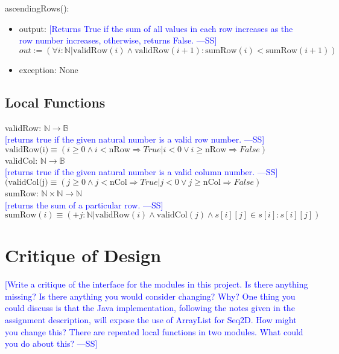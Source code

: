 \documentclass[12pt]{article}
\newcommand{\authornote}[3]{\textcolor{#1}{[#3 ---#2]}}
\newcommand{\authornote}[3]{}
\newcommand{\wss}[1]{\authornote{blue}{SS}{#1}}
\begin{document}
\noindent ascendingRows():
\begin{itemize}
\item output: \wss{Returns True if the sum of all values in each row increases
    as the row number increases, otherwise, returns False.}\\
$out := (\forall i: \mathbb{N} | \text{validRow}(i) \wedge \text{validRow}(i+1): \text{sumRow}(i) < \text{sumRow}(i+1))$
\item exception: None
\end{itemize}

\subsection*{Local Functions}

\noindent validRow: $\mathbb{N} \rightarrow \mathbb{B}$\\
\noindent \wss{returns true if the given natural number is a valid row
  number.}\\ $\text{validRow(i)} \equiv (i \geq 0 \wedge i < \text{nRow} \Rightarrow True | i < 0 \lor i \geq \text{nRow} \Rightarrow False)$\\

\noindent validCol: $\mathbb{N} \rightarrow \mathbb{B}$\\
\noindent \wss{returns true if the given natural number is a valid column
  number.}\\ $(\text{validCol(j)} \equiv (j \geq 0 \wedge j < \text{nCol} \Rightarrow True | j < 0 \lor j \geq \text{nCol} \Rightarrow False)$\\

\noindent sumRow: $\mathbb{N} \times \mathbb{N} \rightarrow \mathbb{N}$\\
\noindent \wss{returns the sum of a particular row.}\\
$\text{sumRow}(i) \equiv (+ j: \mathbb{N} | \text{validRow}(i) \wedge \text{validCol}(j) \wedge s[i][j] \in s[i]: s[i][j])$

\newpage

\section*{Critique of Design}
\wss{Write a critique of the interface for the modules in this project.  Is there
anything missing?  Is there anything you would consider changing?  Why?  One
thing you could discuss is that the Java implementation, following the notes
given in the assignment description, will expose the use of ArrayList for Seq2D.
How might you change this?  There are repeated local functions in two modules.
What could you do about this?} \\
\end{document}
